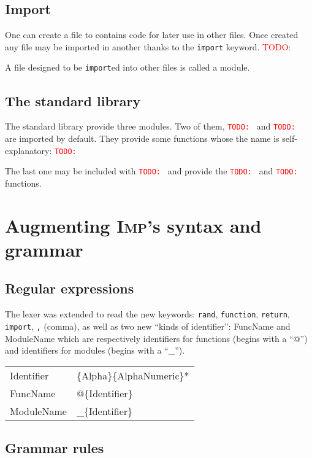 \documentclass[11pt]{article}
\newcommand\todo[1]{\textcolor{red}{TODO: #1}}
\newcommand\imp{\textsc{Imp}\xspace}
\begin{document}
\subsection{Import}

One can create a file to contains code for later use in other files.
Once created any file may be imported in another thanks to the \texttt{import} keyword.
\todo{}

A file designed to be \texttt{import}ed into other files is called a module.

\subsection{The standard library}

The standard library provide three modules. Two of them, \texttt{\todo{}} and \texttt{\todo{}} are imported by default.
They provide some functions whose the name is self-explanatory: \texttt{\todo{}}

The last one may be included with \texttt{\todo{}} and provide the \texttt{\todo{}} and \texttt{\todo{}} functions.

\section{Augmenting \imp's syntax and grammar}

\subsection{Regular expressions}

The lexer was extended to read the new keywords:
\texttt{rand}, \texttt{function}, \texttt{return}, \texttt{import}, \texttt{,} (comma),
as well as two new ``kinds of identifier'': \textsf{FuncName} and \textsf{ModuleName}
which are respectively identifiers for functions (begins with a ``@'')
and identifiers for modules (begins with a ``\_'').

\begin{center}{\sffamily
\begin{tabular}{l @{ = } l}
  Identifier     & \{Alpha\}\{AlphaNumeric\}* \\
  FuncName       & @\{Identifier\} \\
  ModuleName     & \_\{Identifier\} \\
\end{tabular}
}\end{center}

\subsection{Grammar rules}
\end{document}
